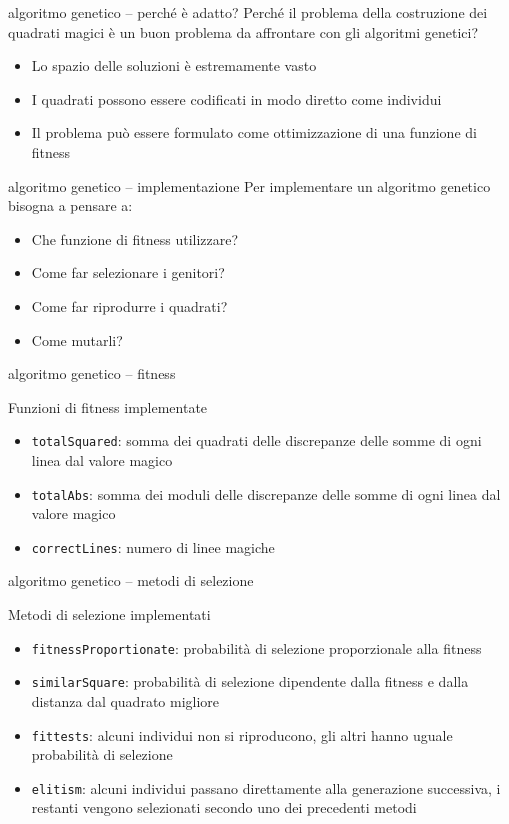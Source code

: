 \documentclass[10pt]{beamer}
\begin{document}
\begin{frame}{algoritmo genetico -- perché è adatto?}
	Perché il problema della costruzione dei quadrati magici è un buon problema da affrontare con gli algoritmi genetici?
	\begin{itemize}
		\item Lo spazio delle soluzioni è estremamente vasto
		\item I quadrati possono essere codificati in modo diretto come individui
		\item Il problema può essere formulato come ottimizzazione di una funzione di fitness
	\end{itemize}
\end{frame}

\begin{frame}{algoritmo genetico -- implementazione}
	Per implementare un algoritmo genetico bisogna a pensare a:
	\begin{itemize}
		\item Che funzione di fitness utilizzare?
		\item Come far selezionare i genitori?
		\item Come far riprodurre i quadrati?
		\item Come mutarli?
	\end{itemize}
\end{frame}

\begin{frame}{algoritmo genetico -- fitness}
	\begin{block}{Funzioni di fitness implementate}
	\parbox{0.98\columnwidth}{
		\begin{itemize}
		\item \texttt{totalSquared}: somma dei quadrati delle discrepanze delle somme di ogni linea dal valore magico
		\item \texttt{totalAbs}: somma dei moduli delle discrepanze delle somme di ogni linea dal valore magico
		\item \texttt{correctLines}: numero di linee magiche
		\end{itemize}
	}
	\end{block}
\end{frame}

\begin{frame}{algoritmo genetico -- metodi di selezione}
	\begin{block}{Metodi di selezione implementati}
	\parbox{0.98\columnwidth}{
	\begin{itemize}
		\item \texttt{fitnessProportionate}: probabilità di selezione proporzionale alla fitness
		\item \texttt{similarSquare}: probabilità di selezione dipendente dalla fitness e dalla distanza dal quadrato migliore
		\item \texttt{fittests}: alcuni individui non si riproducono, gli altri hanno uguale probabilità di selezione
		\item \texttt{elitism}: alcuni individui passano direttamente alla generazione successiva, i restanti vengono selezionati secondo uno dei precedenti metodi
	\end{itemize}
	}
	\end{block}
\end{frame}
\end{document}
